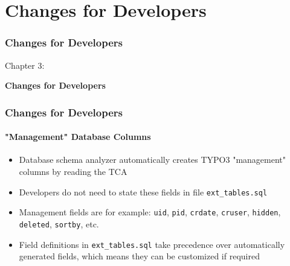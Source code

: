 %

\section{Changes for Developers}
\begin{frame}[fragile]
	\frametitle{Changes for Developers}

	\begin{center}\huge{Chapter 3:}\end{center}
	\begin{center}\huge{\color{typo3darkgrey}\textbf{Changes for Developers}}\end{center}

\end{frame}


\begin{frame}[fragile]
	\frametitle{Changes for Developers}
	\framesubtitle{"Management" Database Columns}

	\begin{itemize}
		\item Database schema analyzer automatically creates TYPO3 "management"
			columns by reading the TCA
		\item Developers do not need to state these fields in file
			\texttt{ext\_tables.sql}
		\item Management fields are for example:\newline
			\texttt{uid}, \texttt{pid}, \texttt{crdate}, \texttt{cruser},
			\texttt{hidden}, \texttt{deleted}, \texttt{sortby}, etc.
		\item Field definitions in \texttt{ext\_tables.sql} take precedence
			over automatically generated fields, which means they can be
			customized if required
	\end{itemize}

\end{frame}

